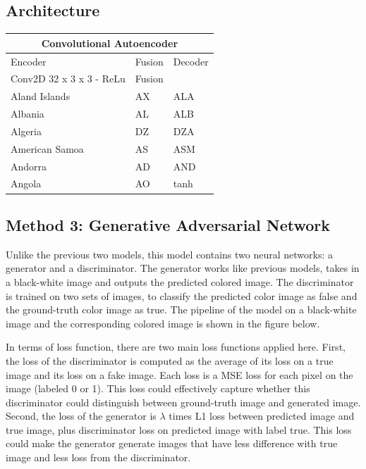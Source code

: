 \documentclass{article}
\begin{document}
\subsection{Architecture}
\setlength{\arrayrulewidth}{0.5mm}
\setlength{\tabcolsep}{18pt}
\renewcommand{\arraystretch}{1.5}
\begin{tabular}{ |p{3cm}|p{3cm}|p{3cm}|  }
\hline
\multicolumn{3}{|c|}{Convolutional Autoencoder} \\
\hline
Encoder & Fusion & Decoder \\
\hline
Conv2D 32 x 3 x 3 - ReLu & Fusion &  \\
Aland Islands & AX   & ALA \\
Albania &AL & ALB \\
Algeria    &DZ & DZA \\
American Samoa & AS & ASM \\
Andorra & AD & AND   \\
Angola & AO & tanh \\
\hline
\end{tabular}


\subsection{Method 3: Generative Adversarial Network}
Unlike the previous two models, this model contains two neural networks: a generator and a discriminator. 
The generator works like previous models, takes in a black-white image and outputs the predicted colored image.
The discriminator is trained on two sets of images, to classify the predicted color image as false and the ground-truth color image as true. 
The pipeline of the model on a black-white image and the corresponding colored image is shown in the figure below.

In terms of loss function, there are two main loss functions applied here. 
First, the loss of the discriminator is computed as the average of its loss on a true image and its loss on a fake image. 
Each loss is a MSE loss for each pixel on the image (labeled 0 or 1). 
This loss could effectively capture whether this discriminator could distinguish between ground-truth image and generated image.
Second, the loss of the generator is $\lambda$ times L1 loss between predicted image and true image, plus discriminator loss on predicted image with label true.
This loss could make the generator generate images that have less difference with true image and less loss from the discriminator.
\end{document}
